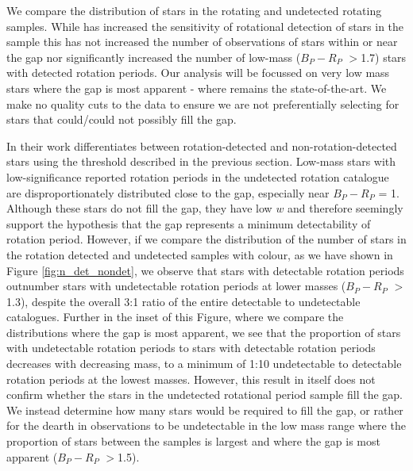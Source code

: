 We compare the distribution of stars in the \citet{mcquillan_rotational_2014} \kepler{} rotating and undetected rotating samples.
While \citet{santos_surface_2019} has increased the sensitivity of rotational detection of stars in the \kepler{} sample this has not increased the number of observations of stars within or near the gap nor significantly increased the number of low-mass ($B_P-R_P$ $>$1.7) stars with detected rotation periods.
Our analysis will be focussed on very low mass stars where the gap is most apparent - where \citet{mcquillan_rotational_2014} remains the state-of-the-art.
We make no quality cuts to the data to ensure we are not preferentially selecting for stars that could/could not possibly fill the gap.

In their work \citet{mcquillan_rotational_2014} differentiates between rotation-detected and non-rotation-detected stars using the threshold described in the previous section. 
Low-mass stars with low-significance reported rotation periods in the undetected rotation catalogue are disproportionately distributed close to the gap, especially near $B_P-R_P$ = 1. 
Although these stars do not fill the gap, they have low $w$ and therefore seemingly support the hypothesis that the gap represents a minimum detectability of rotation period.
However, if we compare the distribution of the number of stars in the rotation detected and undetected samples with colour, as we have shown in Figure \ref{fig:n_det_nondet}, we observe that stars with detectable rotation periods outnumber stars with undetectable rotation periods at lower masses ($B_P-R_P$ $>$1.3), despite the overall 3:1 ratio of the entire detectable to undetectable catalogues.
Further in the inset of this Figure, where we compare the distributions where the gap is most apparent, we see that the proportion of stars with undetectable rotation periods to stars with detectable rotation periods decreases with decreasing mass, to a minimum of 1:10 undetectable to detectable rotation periods at the lowest masses.
However, this result in itself does not confirm whether the stars in the undetected rotational period sample fill the gap.
We instead determine how many stars would be required to fill the gap, or rather for the dearth in observations to be undetectable in the low mass range where the proportion of stars between the samples is largest and where the gap is most apparent ($B_P-R_P$ $>$1.5).

